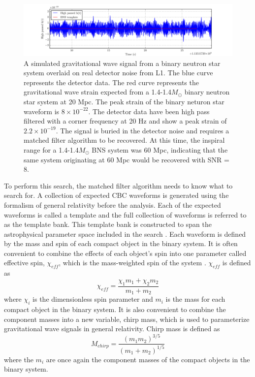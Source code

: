 \begin{figure}[ht!]
\includegraphics[width=\textwidth]{figures/introduction/quiet_BNS}
\caption[BNS signal in detector noise]{A simulated gravitational wave signal from a %
         binary neutron star system overlaid on real detector noise from L1. %
         The blue curve represents the detector data. The red curve represents %
         the gravitational wave strain expected from a 1.4-1.4$M_{\odot}$ %
         binary neutron star system %
         at 20 Mpc. The peak strain of the binary neturon star waveform is %
         $8\times10^{-22}$. %
         The detector data have been high pass filtered with a corner frequency %
         at 20 Hz and show a peak strain of $2.2\times10^{-19}$. The signal is %
         buried in the detector noise and requires a matched filter algorithm %
         to be recovered. At this time, the inspiral range for a 1.4-1.4$M_{\odot}$ %
         BNS system was 60 Mpc, indicating that the same system originating at 60 Mpc %
         would be recovered with SNR = 8. %
         }
\label{fig:quiet-BNS}
\end{figure}

To perform this search, the matched filter algorithm needs to know what to search for.
A collection of expected CBC waveforms is generated using
the formalism of general relativity before the analysis.
Each of the expected waveforms is called a template and
the full collection of waveforms is referred to as the template bank. This template bank
is constructed to span the astrophysical parameter space included in the search
\cite{GW150914-CBC}. Each waveform is defined by the mass and spin of each compact
object in the binary system. It is often convenient to combine the effects of each
object's spin into one parameter called effective spin, $\chi_{eff}$,
which is the
mass-weighted spin of the system \cite{Privitera:2013xza}. $\chi_{eff}$ is defined as
\begin{equation}
\chi_{eff} = \frac{\chi_{1}m_{1} + \chi_{2}m_{2}}{m_{1} + m_{2}}
\end{equation}
where $\chi_{i}$ is the dimensionless spin parameter \cite{Kidder:1995zr}
and $m_{i}$ is the
mass for each compact object in the binary system. It is also convenient to combine
the component masses into a new variable, chirp mass, which is used to
parameterize gravitational wave signals in general relativity. Chirp mass is defined
as
\begin{equation}
M_{chirp} = \frac{(m_1m_2)^{3/5}}{(m_1 + m_2)^{1/5}}
\end{equation}
where the $m_{i}$ are once again the component masses of the compact objects in the
binary system.

